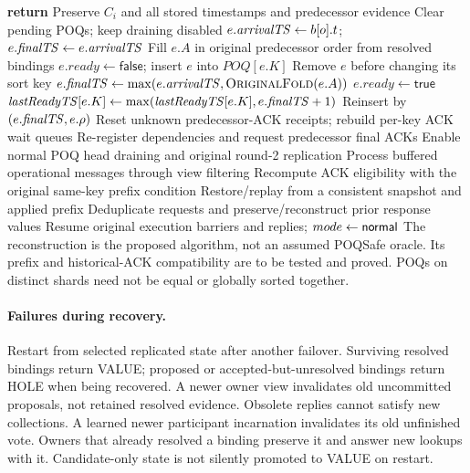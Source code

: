 \begin{algorithm}[p]
\caption{Candidate POQ reconstruction and resumption}
\begin{algorithmic}[1]
    \State \textbf{return}
  \EndIf
  \State Preserve $C_i$ and all stored timestamps and predecessor evidence
  \State Clear pending POQs; keep draining disabled
    \State $e.\mathit{arrivalTS}\gets b[o].t$; $e.\mathit{finalTS}\gets e.\mathit{arrivalTS}$
    \State Fill $e.A$ in original predecessor order from resolved bindings
    \State $e.ready\gets\mathsf{false}$; insert $e$ into $POQ[e.K]$
  \EndFor
    \State Remove $e$ before changing its sort key
    \State $e.\fin\gets\max(e.\arr,\Call{OriginalFold}{e.A})$
    \State $e.ready\gets\mathsf{true}$
    \State $\mathit{lastReadyTS}[e.K]\gets\max(\mathit{lastReadyTS}[e.K],e.\mathit{finalTS}+1)$
    \State Reinsert by $(e.\mathit{finalTS},e.\rho)$
  \EndFor
  \State Reset unknown predecessor-ACK receipts; rebuild per-key ACK wait queues
  \State Re-register dependencies and request predecessor final ACKs
  \State Enable normal POQ head draining and original round-2 replication
  \State Process buffered operational messages through view filtering
  \State Recompute ACK eligibility with the original same-key prefix condition
  \State Restore/replay from a consistent snapshot and applied prefix
  \State Deduplicate requests and preserve/reconstruct prior response values
  \State Resume original execution barriers and replies; $mode\gets\mathsf{normal}$
\EndProcedure
\Statex The reconstruction is the proposed algorithm, not an assumed POQSafe oracle.
\Statex Its prefix and historical-ACK compatibility are to be tested and proved.
\Statex POQs on distinct shards need not be equal or globally sorted together.
\end{algorithmic}
\end{algorithm}

\paragraph{Failures during recovery.}
Restart from selected replicated state after another failover. Surviving resolved
bindings return VALUE; proposed or accepted-but-unresolved bindings return HOLE
when being recovered. A newer owner view invalidates old uncommitted proposals,
not retained resolved evidence. Obsolete replies cannot satisfy new collections.
A learned newer participant incarnation invalidates its old unfinished vote.
Owners that already resolved a binding preserve it and answer new lookups with it.
Candidate-only state is not silently promoted to VALUE on restart.

